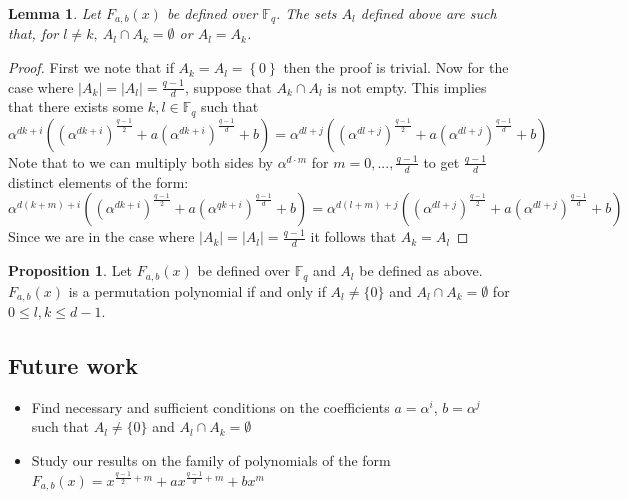 \documentclass{article}
\newtheorem{lemma}[theorem]{Lemma}
\theoremstyle{definition}
\newtheorem{prop}[theorem]{Proposition}
\theoremstyle{remark}
\numberwithin{equation}{section}
\begin{document}
    \begin{lemma}\label{conjuntos_disjuntos}
      Let $F_{a,b}(x)$ be defined over $\mathbb{F}_{q}$. The sets $A_l$ defined  above are such that, for $l \not = k , \ A_l \cap A_k = \emptyset$ or $A_l = A_k$.
    \end{lemma}

    \begin{proof}
      First we note that if $A_k = A_l = \left\{ 0 \right\}$ then the proof is trivial. Now for the case where $\left\vert A_k \right\vert = \left\vert A_l \right\vert = \frac{q-1}{d}$, suppose that $ A_k \cap A_l$ is not empty. This implies that there exists some $k,l \in \mathbb{F}_{q}$ such that 
      $$\alpha^{dk+i}((\alpha^{dk+i})^{\frac{q-1}{2}}+a(\alpha^{dk+i})^{\frac{q-1}{d}}+b) = \alpha^{dl+j}((\alpha^{dl+j})^{\frac{q-1}{2}}+a(\alpha^{dl+j})^{\frac{q-1}{d}}+b)$$
      Note that to we can multiply both sides by $\alpha^{d\cdot m}$ for $m=0,...,\frac{q-1}{d}$ to get $\frac{q-1}{d}$ distinct elements of the form:
      $$\alpha^{d(k+m)+i}((\alpha^{dk+i})^{\frac{q-1}{2}}+a(\alpha^{qk+i})^{\frac{q-1}{d}}+b) = \alpha^{d(l+m)+j}((\alpha^{dl+j})^{\frac{q-1}{2}}+a(\alpha^{dl+j})^{\frac{q-1}{d}}+b)$$
      Since we are in the case where  $\left\vert A_k \right\vert = \left\vert A_l \right\vert = \frac{q-1}{d}$ it follows that $A_k = A_l$
    \end{proof}

    \begin{prop}
      Let $F_{a,b}(x)$ be defined over $\mathbb{F}_{q}$ and $A_l$ be defined as above. $F_{a,b}(x)$ is a permutation polynomial if and only if $A_l \neq \{0\}$ and $A_l \cap A_k = \emptyset$ for $ 0 \leq l,k \leq d-1$. 
    \end{prop}
    
\subsection{Future work}    

    \begin{itemize}
      \item Find necessary and sufficient conditions on the coefficients $a=\alpha^i$, $b=\alpha^j$ such that $A_l \neq \{0\}$ and $A_l \cap A_k = \emptyset$
      \item Study our results on the family of polynomials of the form $F_{a,b}(x) = x^{\frac{q-1}{2}+m} + a x^{\frac{q-1}{d}+m} + b x^{m}$
    \end{itemize}
 
  
\end{document}
